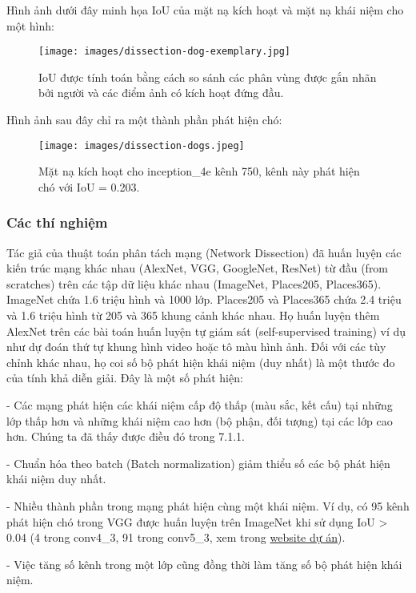 Hình ảnh dưới đây minh họa IoU của mặt nạ kích hoạt và mặt nạ khái niệm cho một hình:

\begin{figure*}[h!]
	\centering
	\texttt{[image: images/dissection-dog-exemplary.jpg]}
	\label{fig:7_7}
	\caption{IoU được tính toán bằng cách so sánh các phân vùng được gắn nhãn bởi người và các điểm ảnh có kích hoạt đứng đầu.}
\end{figure*}

Hình ảnh sau đây chỉ ra một thành phần phát hiện chó:

\begin{figure*}[h!]
	\centering
	\texttt{[image: images/dissection-dogs.jpeg]}
	\label{fig:7_8}
	\caption{Mặt nạ kích hoạt cho inception\_4e kênh 750, kênh này phát hiện chó với IoU = 0.203.}
\end{figure*}

\subsubsection{Các thí nghiệm}

Tác giả của thuật toán phân tách mạng (Network Dissection) đã huấn luyện các kiến trúc mạng khác nhau (AlexNet, VGG, GoogleNet, ResNet) từ đầu (from scratches) trên các tập dữ liệu khác nhau (ImageNet, Places205, Places365). ImageNet chứa 1.6 triệu hình và 1000 lớp. Places205 và Places365 chứa 2.4 triệu và 1.6 triệu hình từ 205 và 365 khung cảnh khác nhau. Họ huấn luyện thêm AlexNet trên các bài toán huấn luyện tự giám sát (self-supervised training) ví dụ như dự đoán thứ tự khung hình video hoặc tô màu hình ảnh. Đối với các tùy chỉnh khác nhau, họ coi số bộ phát hiện khái niệm (duy nhất) là một thước đo của tính khả diễn giải. Đây là một số phát hiện:

- Các mạng phát hiện các khái niệm cấp độ thấp (màu sắc, kết cấu) tại những lớp thấp hơn và những khái niệm cao hơn (bộ phận, đối tượng) tại các lớp cao hơn. Chúng ta đã thấy được điều đó trong 7.1.1.

- Chuẩn hóa theo batch (Batch normalization) giảm thiểu số các bộ phát hiện khái niệm duy nhất.

- Nhiều thành phần trong mạng phát hiện cùng một khái niệm. Ví dụ, có 95 kênh phát hiện chó trong VGG được huấn luyện trên ImageNet khi sử dụng IoU > 0.04 (4 trong conv4\_3, 91 trong conv5\_3, xem trong \href{http://netdissect.csail.mit.edu/dissect/vgg16_imagenet/}{website dự án}).

- Việc tăng số kênh trong một lớp cũng đồng thời làm tăng số bộ phát hiện khái niệm.

